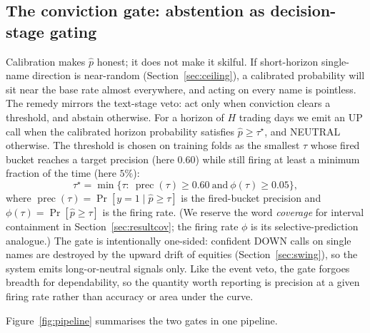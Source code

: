 \documentclass{elektr}
\begin{document}
\subsection{The conviction gate: abstention as decision-stage gating}
\label{sec:gate}
Calibration makes $\hat p$ honest; it does not make it skilful. If short-horizon single-name direction is near-random (Section~\ref{sec:ceiling}), a calibrated probability will sit near the base rate almost everywhere, and acting on every name is pointless. The remedy mirrors the text-stage veto: act only when conviction clears a threshold, and abstain otherwise. For a horizon of $H$ trading days we emit an UP call when the calibrated horizon probability satisfies $\hat p\ge\tau^\star$, and NEUTRAL otherwise. The threshold is chosen on training folds as the smallest $\tau$ whose fired bucket reaches a target precision (here $0.60$) while still firing at least a minimum fraction of the time (here $5\%$):
\begin{equation}
\label{eq:tau}
\tau^\star=\min\Big\{\tau:\ \operatorname{prec}(\tau)\ge 0.60\ \text{and}\ \phi(\tau)\ge 0.05\Big\},
\end{equation}
where $\operatorname{prec}(\tau)=\Pr[y=1\mid \hat p\ge\tau]$ is the fired-bucket precision and $\phi(\tau)=\Pr[\hat p\ge\tau]$ is the firing rate. (We reserve the word \emph{coverage} for interval containment in Section~\ref{sec:resultcov}; the firing rate $\phi$ is its selective-prediction analogue.) The gate is intentionally one-sided: confident DOWN calls on single names are destroyed by the upward drift of equities (Section~\ref{sec:swing}), so the system emits long-or-neutral signals only. Like the event veto, the gate forgoes breadth for dependability, so the quantity worth reporting is precision at a given firing rate rather than accuracy or area under the curve.

Figure~\ref{fig:pipeline} summarises the two gates in one pipeline.
\end{document}
